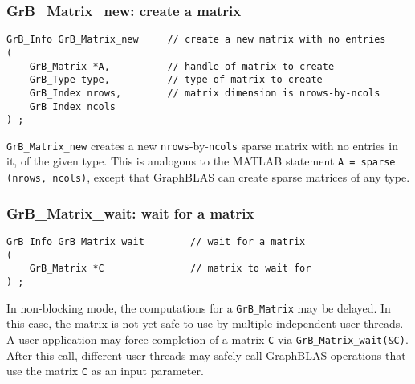 \documentclass[12pt]{article}
\begin{document}
\vspace{0.2in}

\subsubsection{{\sf GrB\_Matrix\_new:}          create a matrix}
\label{matrix_new}

\begin{mdframed}[userdefinedwidth=6in]
{\footnotesize
\begin{verbatim}
GrB_Info GrB_Matrix_new     // create a new matrix with no entries
(
    GrB_Matrix *A,          // handle of matrix to create
    GrB_Type type,          // type of matrix to create
    GrB_Index nrows,        // matrix dimension is nrows-by-ncols
    GrB_Index ncols
) ;
\end{verbatim} } \end{mdframed}

\verb'GrB_Matrix_new' creates a new \verb'nrows'-by-\verb'ncols' sparse matrix
with no entries in it, of the given type.  This is analogous to the MATLAB
statement \verb'A = sparse (nrows, ncols)', except that GraphBLAS can create
sparse matrices of any type.

\subsubsection{{\sf GrB\_Matrix\_wait:} wait for a matrix}


\begin{mdframed}[userdefinedwidth=6in]
{\footnotesize
\begin{verbatim}
GrB_Info GrB_Matrix_wait        // wait for a matrix
(
    GrB_Matrix *C               // matrix to wait for
) ;
\end{verbatim}
}\end{mdframed}

In non-blocking mode, the computations for a \verb'GrB_Matrix' may be delayed.
In this case, the matrix is not yet safe to use by multiple independent user
threads.  A user application may force completion of a matrix \verb'C' via
\verb'GrB_Matrix_wait(&C)'.  After this call, different user threads may safely
call GraphBLAS operations that use the matrix \verb'C' as an input parameter.
\end{document}
